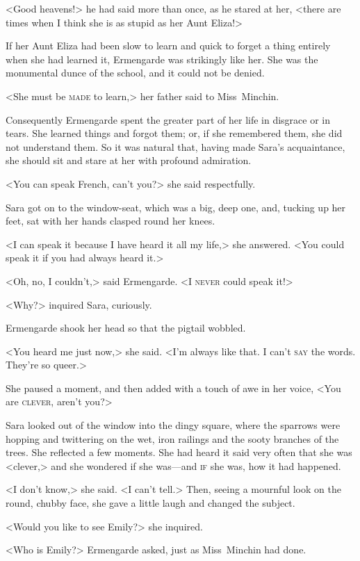 <Good heavens!> he had said more than once, as he stared at her, <there are times when I think she is as stupid as her Aunt Eliza!>

If her Aunt Eliza had been slow to learn and quick to forget a thing entirely when she had learned it, Ermengarde was strikingly like her. She was the monumental dunce of the school, and it could not be denied.

<She must be \textsc{made} to learn,> her father said to Miss~Minchin.

Consequently Ermengarde spent the greater part of her life in disgrace or in tears. She learned things and forgot them; or, if she remembered them, she did not understand them. So it was natural that, having made Sara's acquaintance, she should sit and stare at her with profound admiration.

<You can speak French, can't you?> she said respectfully.

Sara got on to the window-seat, which was a big, deep one, and, tucking up her feet, sat with her hands clasped round her knees.

<I can speak it because I have heard it all my life,> she answered. <You could speak it if you had always heard it.>

<Oh, no, I couldn't,> said Ermengarde. <I \textsc{never} could speak it!>

<Why?> inquired Sara, curiously.

Ermengarde shook her head so that the pigtail wobbled.

<You heard me just now,> she said. <I'm always like that. I can't \textsc{say} the words. They're so queer.>

She paused a moment, and then added with a touch of awe in her voice, <You are \textsc{clever}, aren't you?>

Sara looked out of the window into the dingy square, where the sparrows were hopping and twittering on the wet, iron railings and the sooty branches of the trees. She reflected a few moments. She had heard it said very often that she was <clever,> and she wondered if she was—and \textsc{if} she was, how it had happened.

<I don't know,> she said. <I can't tell.> Then, seeing a mournful look on the round, chubby face, she gave a little laugh and changed the subject.

<Would you like to see Emily?> she inquired.

<Who is Emily?> Ermengarde asked, just as Miss~Minchin had done.

